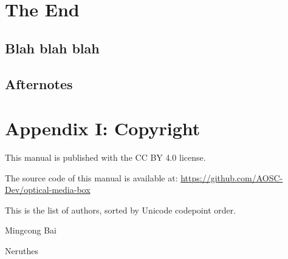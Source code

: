     \chapter{The End}
    \lipsum[1]
    
    \section{Blah blah blah}
    \lipsum[1]
    


    \section*{Afternotes}
    \lipsum[1]
    
    \lipsum[1]



    \chapter*{Appendix I: Copyright}

    This manual is published with the CC BY 4.0 license.

    The source code of this manual is available at:\newline
    \hspace{2em}\underline{\ttfamily\footnotesize{https://github.com/AOSC-Dev/optical-media-box}}

    This is the list of authors, sorted by Unicode codepoint order.

    \begin{compactitem}
        \item Mingcong Bai
        \item Neruthes
    \end{compactitem}

    \pagestyle{empty}
    \cleardoublepage
